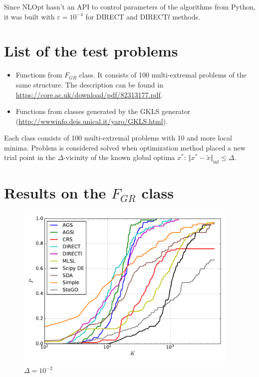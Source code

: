 \documentclass[a4paper]{article}
\begin{document}
Since NLOpt hasn't an API to control parameters of the algorithms from Python, it was built with $\varepsilon=10^{-4}$ for DIRECT and DIRECT$l$ methods.

\section{List of the test problems}

\begin{itemize}
  \item Functions from $F_{GR}$ class. It consists of 100 multi-extremal problems of the same structure. The description can be found in \url{https://core.ac.uk/download/pdf/82313177.pdf}.
  \item Functions from classes generated by the GKLS generator (\url{http://wwwinfo.deis.unical.it/yaro/GKLS.html}).
\end{itemize}

Each class consists of 100 multi-extremal problems with 10 and more local minima. Problem is considered solved when optimization method placed a new trial point in the $\Delta$-vicinity of the known global optima $x^*$: $\Vert x^* - \widetilde{x} \Vert_{\inf} \le \Delta$.


\section{Results on the $F_{GR}$ class}

\begin{figure}[H]
  \center
  \includegraphics[width=0.95\textwidth]{../experiments/grish/cmc.pdf}
  \caption{$\Delta=10^{-2}$}
\end{figure}
\end{document}
